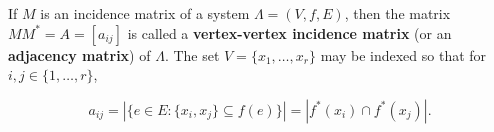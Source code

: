 If $M$ is an incidence matrix of a system $\Lambda = (V, f, E)$, then the matrix $MM^{*} = A = [a_{ij}]$ is called a \textbf{vertex-vertex incidence matrix} (or an \textbf{adjacency matrix}) of $\Lambda$. The set $V = \{x_1, \ldots, x_r\}$ may be indexed so that for $i, j \in \{1, \ldots, r\}$,

$$a_{ij} = |\{e \in E : \{x_i, x_j\} \subseteq f(e)\}| = |f^{*}(x_i) \cap f^{*}(x_j)|.$$
